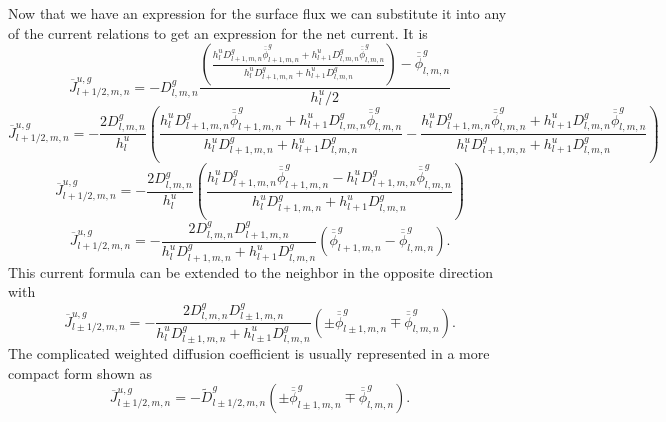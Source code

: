 \documentclass{ansconf}
\numberwithin{equation}{section}
\begin{document}
Now that we have an expression for the surface flux we can substitute it into any of the current relations to get an expression for the net current. It is
\begin{equation}
\overline{J}^{u,g}_{l+1/2,m,n}=-D_{l,m,n}^{g}\frac{\left(\frac{h_{l}^{u}D_{l+1,m,n}^{g}
\overline{\overline{\phi}}_{l+1,m,n}^{g}+h_{l+1}^{u}
D_{l,m,n}^{g}\overline{\overline{\phi}}_{l,m,n}^{g}}{h_{l}^{u}D_{l+1,m,n}^{g}+h_{l+1}^{u}D_{l,m,n}^{g}}\right)-
\overline{\overline{\phi}}_{l,m,n}^{g}}{h_{l}^{u}/2}
\end{equation}
\begin{equation}
\overline{J}^{u,g}_{l+1/2,m,n}=-\frac{2D_{l,m,n}^{g}}{h_{l}^{u}}\left(\frac{h_{l}^{u}D_{l+1,m,n}^{g}
\overline{\overline{\phi}}_{l+1,m,n}^{g}+h_{l+1}^{u}
D_{l,m,n}^{g}\overline{\overline{\phi}}_{l,m,n}^{g}}{h_{l}^{u}D_{l+1,m,n}^{g}+h_{l+1}^{u}D_{l,m,n}^{g}}-
\frac{h_{l}^{u}D_{l+1,m,n}^{g}
\overline{\overline{\phi}}_{l,m,n}^{g}+h_{l+1}^{u}
D_{l,m,n}^{g}\overline{\overline{\phi}}_{l,m,n}^{g}}{h_{l}^{u}D_{l+1,m,n}^{g}+h_{l+1}^{u}D_{l,m,n}^{g}}\right)
\end{equation}
\begin{equation}
\overline{J}^{u,g}_{l+1/2,m,n}=-\frac{2D_{l,m,n}^{g}}{h_{l}^{u}}\left(\frac{h_{l}^{u}
D_{l+1,m,n}^{g}\overline{\overline{\phi}}_{l+1,m,n}^{g}-h_{l}^{u}D_{l+1,m,n}^{g}\overline{\overline{\phi}}_{l,m,n}^{g}}{h_{l}^{u}D_{l+1,m,n}^{g}+h_{l+1}^{u}D_{l,m,n}^{g}}\right)
\end{equation}
\begin{equation}
\overline{J}^{u,g}_{l+1/2,m,n}=-\frac{2D_{l,m,n}^{g}
D_{l+1,m,n}^{g}}{h_{l}^{u}D_{l+1,m,n}^{g}+h_{l+1}^{u}D_{l,m,n}^{g}}
\left(\overline{\overline{\phi}}_{l+1,m,n}^{g}-
\overline{\overline{\phi}}_{l,m,n}^{g}\right).
\end{equation}
This current formula can be extended to the neighbor in the opposite direction with
\begin{equation}
\overline{J}^{u,g}_{l\pm1/2,m,n}=-\frac{2D_{l,m,n}^{g}
D_{l\pm1,m,n}^{g}}{h_{l}^{u}D_{l\pm1,m,n}^{g}+h_{l\pm1}^{u}D_{l,m,n}^{g}}
\left(\pm\overline{\overline{\phi}}_{l\pm1,m,n}^{g}\mp
\overline{\overline{\phi}}_{l,m,n}^{g}\right).
\end{equation}
The complicated weighted diffusion coefficient is usually represented in a more compact form shown as
\begin{equation}\label{eq:FD_cellcur}
\overline{J}^{u,g}_{l\pm1/2,m,n}=
-\widetilde{D}_{l\pm1/2,m,n}^{g}
\left(\pm\overline{\overline{\phi}}_{l\pm1,m,n}^{g}\mp
\overline{\overline{\phi}}_{l,m,n}^{g}\right).
\end{equation}
\end{document}

